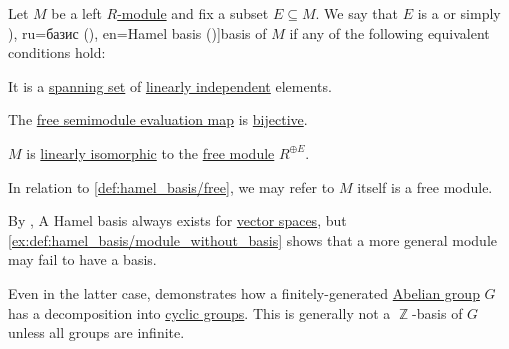 \begin{definition}\label{def:hamel_basis}
  Let \( M \) be a left \hyperref[def:module]{\( R \)-module} and fix a subset \( E \subseteq M \). We say that \( E \) is a  or simply \term[bg=базис (\cite[100]{Обрешков1962ВисшаАлгебра}), ru=базис (\cite[\S 3.7]{Тыртышников2007ЛинейнаяАлгебра}), en=Hamel basis (\cite[example B-2.12]{Rotman2015AdvancedModernAlgebraPart1})]{basis} of \( M \) if any of the following equivalent conditions hold:

  \begin{thmenum}
     It is a \hyperref[thm:generated_submodule]{spanning set} of \hyperref[def:linear_dependence]{linearly independent} elements.

     The \hyperref[thm:free_semimodule_universal_property]{free semimodule evaluation map} is \hyperref[def:function_invertibility/bijective]{bijective}.

    \mimprovised \( M \) is \hyperref[def:linear_function]{linearly isomorphic} to the \hyperref[def:free_semimodule]{free module} \( R^{\oplus E} \).
  \end{thmenum}
\end{definition}
\begin{comments}
  \item In relation to \cref{def:hamel_basis/free}, we may refer to \( M \) itself is a free module.
  \item By , A Hamel basis always exists for \hyperref[def:vector_space]{vector spaces}, but \cref{ex:def:hamel_basis/module_without_basis} shows that a more general module may fail to have a basis.

  Even in the latter case,  demonstrates how a finitely-generated \hyperref[def:abelian_group]{Abelian group} \( G \) has a decomposition into \hyperref[def:cyclic_group]{cyclic groups}. This is generally not a \( \BbbZ \)-basis of \( G \) unless all groups are infinite.
\end{comments}
